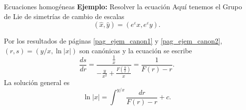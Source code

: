\documentclass[handout,hyperref={colorlinks=true}]{beamer}
\renewcommand{\epsilon}{\varepsilon}
\begin{document}
\begin{frame}{Ecuaciones homogéneas}
\textbf{Ejemplo:} Resolver la ecuación 
Aquí tenemos el Grupo de Lie de simetrías de cambio de escalas
\[(\hat{x},\hat{y})=(e^{\epsilon}x,e^{\epsilon}y).\] 

Por los resultados de páginas \ref{pag_ejem_canon1} y \ref{pag_ejem_canon2}, $(r,s)=(y/x,\ln|x|)$ son canónicas y la ecuación se escribe
\[\frac{ds}{dr}=\frac{\frac{1}{x}}{-\frac{y}{x^2}+\frac{F\left(\frac{y}{x}\right)}{x}}=\frac{1}{F(r)-r}.\]
La solución general es 
\[\ln|x|=\int^{y/x}\frac{dr}{F(r)-r}+c.\]

\end{frame}
\end{document}
